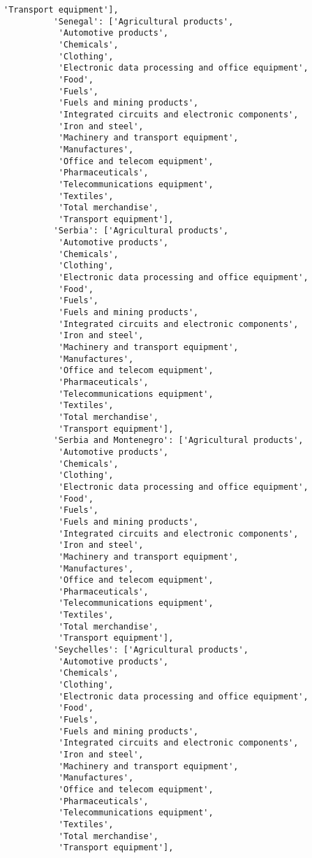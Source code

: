 \documentclass[11pt]{article}
\begin{document}
\begin{Verbatim}[commandchars=\\\{\}]
           'Transport equipment'],
          'Senegal': ['Agricultural products',
           'Automotive products',
           'Chemicals',
           'Clothing',
           'Electronic data processing and office equipment',
           'Food',
           'Fuels',
           'Fuels and mining products',
           'Integrated circuits and electronic components',
           'Iron and steel',
           'Machinery and transport equipment',
           'Manufactures',
           'Office and telecom equipment',
           'Pharmaceuticals',
           'Telecommunications equipment',
           'Textiles',
           'Total merchandise',
           'Transport equipment'],
          'Serbia': ['Agricultural products',
           'Automotive products',
           'Chemicals',
           'Clothing',
           'Electronic data processing and office equipment',
           'Food',
           'Fuels',
           'Fuels and mining products',
           'Integrated circuits and electronic components',
           'Iron and steel',
           'Machinery and transport equipment',
           'Manufactures',
           'Office and telecom equipment',
           'Pharmaceuticals',
           'Telecommunications equipment',
           'Textiles',
           'Total merchandise',
           'Transport equipment'],
          'Serbia and Montenegro': ['Agricultural products',
           'Automotive products',
           'Chemicals',
           'Clothing',
           'Electronic data processing and office equipment',
           'Food',
           'Fuels',
           'Fuels and mining products',
           'Integrated circuits and electronic components',
           'Iron and steel',
           'Machinery and transport equipment',
           'Manufactures',
           'Office and telecom equipment',
           'Pharmaceuticals',
           'Telecommunications equipment',
           'Textiles',
           'Total merchandise',
           'Transport equipment'],
          'Seychelles': ['Agricultural products',
           'Automotive products',
           'Chemicals',
           'Clothing',
           'Electronic data processing and office equipment',
           'Food',
           'Fuels',
           'Fuels and mining products',
           'Integrated circuits and electronic components',
           'Iron and steel',
           'Machinery and transport equipment',
           'Manufactures',
           'Office and telecom equipment',
           'Pharmaceuticals',
           'Telecommunications equipment',
           'Textiles',
           'Total merchandise',
           'Transport equipment'],

\end{Verbatim}
\end{document}
